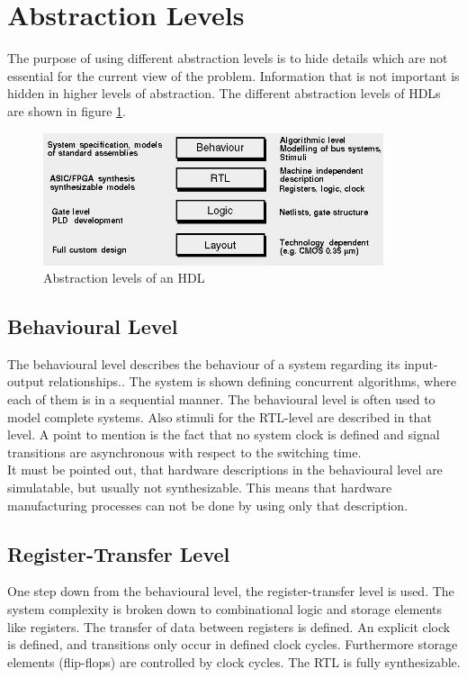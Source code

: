 \section{Abstraction Levels}
The purpose of using different abstraction levels is to hide details which are not essential for the current view of the problem. Information that is not important is hidden in higher levels of abstraction. The different abstraction levels of HDLs are shown in figure \ref{fig:hdlabstractionlevels}.
\begin{figure}[htbp]
\begin{center}
\includegraphics[width=10cm,keepaspectratio=true]{bilder/png/hdlabstractionlevels}
\caption{Abstraction levels of an HDL \cite{Ver16}}
\label{fig:hdlabstractionlevels}
\end{center}
\end{figure}
\subsection{Behavioural Level}
The behavioural level describes the behaviour of a system regarding its input-output relationships.\cite{Hartenstein1987}. The system is shown defining concurrent algorithms, where each of them is in a sequential manner. The behavioural level is often used to model complete systems. Also stimuli for the RTL-level are described in that level. A point to mention is the fact that no system clock is defined and signal transitions are asynchronous with respect to the switching time.\\
It must be pointed out, that hardware descriptions in the behavioural level are simulatable, but usually not synthesizable. This means that hardware manufacturing processes can not be done by using only that description.\cite{Ver16}
\subsection{Register-Transfer Level}
One step down from the behavioural level, the register-transfer level is used. The system complexity is broken down to combinational logic and storage elements like registers. The transfer of data between registers is defined. An explicit clock is defined, and transitions only occur in defined clock cycles. Furthermore storage elements (flip-flops) are controlled by clock cycles. The RTL is fully synthesizable.\cite{Ver16}\cite{Asic14}
